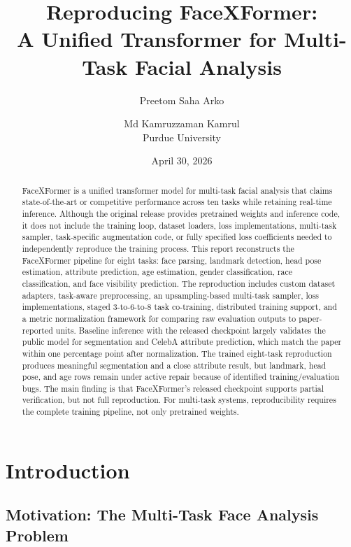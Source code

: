\documentclass[11pt]{article}
\title{\textbf{Reproducing FaceXFormer:}\\A Unified Transformer for Multi-Task Facial Analysis}
\author{Preetom Saha Arko \and Md Kamruzzaman Kamrul\\Purdue University}
\date{April 30, 2026}
\begin{document}
\maketitle

\begin{abstract}
FaceXFormer is a unified transformer model for multi-task facial analysis that claims state-of-the-art or competitive performance across ten tasks while retaining real-time inference. Although the original release provides pretrained weights and inference code, it does not include the training loop, dataset loaders, loss implementations, multi-task sampler, task-specific augmentation code, or fully specified loss coefficients needed to independently reproduce the training process. This report reconstructs the FaceXFormer pipeline for eight tasks: face parsing, landmark detection, head pose estimation, attribute prediction, age estimation, gender classification, race classification, and face visibility prediction. The reproduction includes custom dataset adapters, task-aware preprocessing, an upsampling-based multi-task sampler, loss implementations, staged 3-to-6-to-8 task co-training, distributed training support, and a metric normalization framework for comparing raw evaluation outputs to paper-reported units. Baseline inference with the released checkpoint largely validates the public model for segmentation and CelebA attribute prediction, which match the paper within one percentage point after normalization. The trained eight-task reproduction produces meaningful segmentation and a close attribute result, but landmark, head pose, and age rows remain under active repair because of identified training/evaluation bugs. The main finding is that FaceXFormer's released checkpoint supports partial verification, but not full reproduction. For multi-task systems, reproducibility requires the complete training pipeline, not only pretrained weights.
\end{abstract}

\newpage
\tableofcontents
\newpage

\section{Introduction}


\subsection{Motivation: The Multi-Task Face Analysis Problem}
\end{document}
